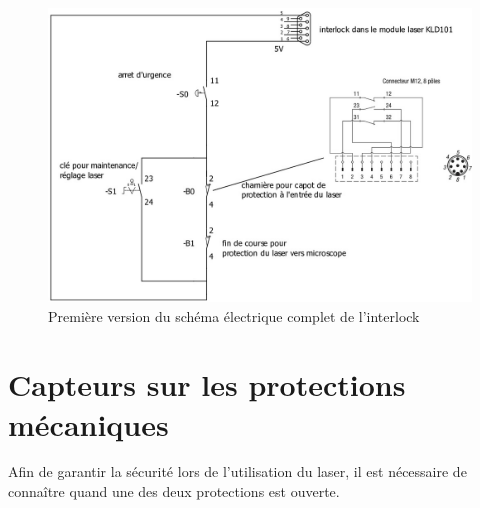 \begin{figure}[H]
    \begin{center}
        \includegraphics[width=\textwidth]{assets/figures/Protections_laser/Securite_electrique/interlock_schema_elec_V1.jpeg}
    \end{center}
    \caption{Première version du schéma électrique complet de l'interlock}
    \label{schema_interlock_v1}
\end{figure}
\newpage
\section{Capteurs sur les protections mécaniques}
Afin de garantir la sécurité lors de l'utilisation du laser, il est nécessaire de connaître quand une des deux protections est ouverte.

